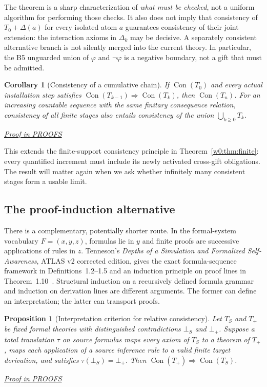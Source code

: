 \documentclass[11pt,letterpaper]{article}
\newtheorem{proposition}[theorem]{Proposition}
\newtheorem{corollary}[theorem]{Corollary}
\theoremstyle{definition}\newtheorem{definition}[theorem]{Definition}\newtheorem{example}[theorem]{Example}
\theoremstyle{remark}\newtheorem{remark}[theorem]{Remark}
\newcommand{\Con}{\operatorname{Con}}
\newcommand{\prooflink}[1]{\par\noindent\hfill\small\hyperref[#1]{\textit{Proof in PROOFS}}\normalsize}
\begin{document}
The theorem is a sharp characterization of \emph{what must be checked}, not a
uniform algorithm for performing those checks. It also does not imply that
consistency of $T_0+\Delta(a)$ for every isolated atom $a$ guarantees
consistency of their joint extension: the interaction axioms in $\Delta_k$
may be decisive.  A separately consistent alternative branch is not
silently merged into the current theory.  In particular, the B5
unguarded union of $\varphi$ and $\neg\varphi$ is a negative boundary,
not a gift that must be admitted.

\begin{corollary}[Consistency of a cumulative chain]\label{br:co:chain}
If $\Con(T_0)$ and every actual installation step satisfies
$\Con(T_{k-1})\Rightarrow\Con(T_k)$, then $\Con(T_n)$.
For an increasing countable sequence with the same finitary consequence
relation, consistency of all finite stages also entails consistency of
the union $\bigcup_{k\ge0}T_k$.
\prooflink{br:pr:chain}
\end{corollary}

This extends the finite-support consistency principle in
Theorem~\ref{w0:thm:finite}: every quantified increment must include
its newly activated cross-gift obligations.  The result will matter again when
we ask whether infinitely many consistent stages form a usable limit.

\subsection{The proof-induction alternative}
There is a complementary, potentially shorter route.  In the formal-system
vocabulary $F=(x,y,z)$, formulas lie in $y$ and finite proofs are successive
applications of rules in $z$. Tenneson's \emph{Depths of a Simulation and
Formalized Self-Awareness}, ATLAS v2 corrected edition, gives the exact
formula-sequence framework in Definitions~1.2--1.5 and an induction principle
on proof lines in Theorem~1.10~\cite{depthsv2}.  Structural induction on a
recursively defined formula grammar and induction on derivation lines are
different arguments.  The former can define an interpretation; the latter
can transport proofs.

\begin{proposition}[Interpretation criterion for relative consistency]\label{br:prop:interpret}
Let $T_S$ and $T_+$ be fixed formal theories with distinguished
contradictions $\bot_S$ and $\bot_+$. Suppose a total translation $\tau$
on source formulas maps every axiom of $T_S$ to a theorem of $T_+$,
maps each application of a source inference rule to a valid finite
target derivation, and satisfies $\tau(\bot_S)=\bot_+$.
Then $\Con(T_+)\Rightarrow\Con(T_S)$.
\prooflink{br:pr:interpret}
\end{proposition}
\end{document}
